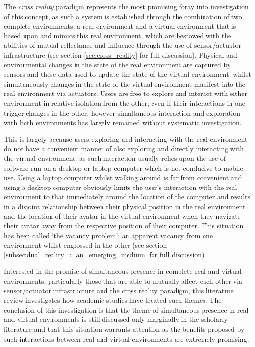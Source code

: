 The \textit{cross reality} paradigm represents the most promising foray into investigation of this concept, as such a system is established through the combination of two complete environments, a real environment and a virtual environment that is based upon and mimics this real environment, which are bestowed with the abilities of mutual reflectance and influence through the use of sensor/actuator infrastructure (see section \ref{sec:cross_reality} for full discussion). Physical and environmental changes in the state of the real environment are captured by sensors and these data used to update the state of the virtual environment, whilst simultaneously changes in the state of the virtual environment manifest into the real environment via actuators. Users are free to explore and interact with either environment in relative isolation from the other, even if their interactions in one trigger changes in the other, however simultaneous interaction and exploration with both environments has largely remained without systematic investigation.

This is largely because users exploring and interacting with the real environment do not have a convenient manner of also exploring and directly interacting with the virtual environment, as such interaction usually relies upon the use of software run on a desktop or laptop computer which is not conducive to mobile use. Using a laptop computer whilst walking around is far from convenient and using a desktop computer obviously limits the user's interaction with the real environment to that immediately around the location of the  computer and results in a disjoint relationship between their physical position in the real environment and the location of their avatar in the virtual environment when they navigate their avatar away from the respective position of their computer. This situation has been called `the vacancy problem'; an apparent vacancy from one environment whilst engrossed in the other (see section \ref{subsec:dual_reality_:_an_emerging_medium} for full discussion).

Interested in the promise of simultaneous presence in complete real and virtual environments, particularly those that are able to mutually affect each other via sensor/actuator infrastructure and the cross reality paradigm, this literature review investigates how academic studies have treated such themes. The conclusion of this investigation is that the theme of simultaneous presence in real and virtual environments is still discussed only marginally in the scholarly literature and that this situation warrants attention as the benefits proposed by such interactions between real and virtual environments are extremely promising.

